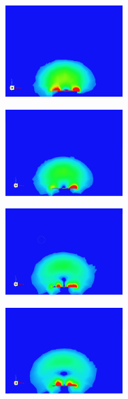 \documentclass[12pt]{article}
\begin{document}
\begin{figure}[h]
    \begin{subfigure}{0.5\textwidth}
    \centering
    	\includegraphics[width=0.5\textwidth]{basic-patch-antenna-radiating-t0.png}
    \end{subfigure}
    \begin{subfigure}{0.5\textwidth}
    \centering
    	\includegraphics[width=0.5\textwidth]{basic-patch-antenna-radiating-t1.png}
	\end{subfigure}   
    \begin{subfigure}{0.5\textwidth}
    \centering
    	\includegraphics[width=0.5\textwidth]{basic-patch-antenna-radiating-t2.png}
	\end{subfigure}    
    \begin{subfigure}{0.5\textwidth}
    \centering
    	\includegraphics[width=0.5\textwidth]{basic-patch-antenna-radiating-t3.png}

\end{subfigure}
\end{figure}
\end{document}
